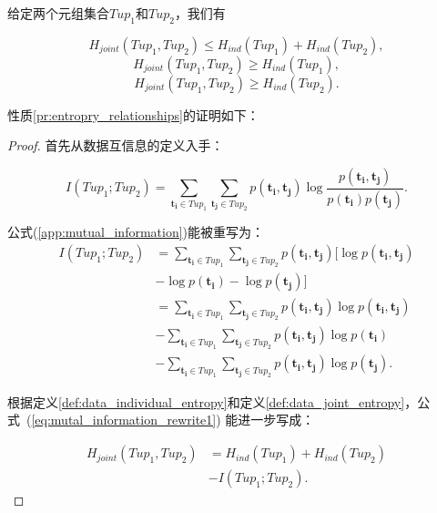 \begin{propt}[不同数据信息熵之间的关系]
给定两个元组集合$Tup_1$和$Tup_2$，我们有

\begin{equation}
\label{pr:entropry_relationships}
  H_{joint}(Tup_1,Tup_2)\le H_{ind}(Tup_1)+H_{ind}(Tup_2),
\end{equation}
\begin{equation}
  H_{joint}(Tup_1,Tup_2)\ge H_{ind}(Tup_1),
\end{equation}
\begin{equation}
  H_{joint}(Tup_1,Tup_2)\ge H_{ind}(Tup_2).
\end{equation}

性质\ref{pr:entropry_relationships}的证明如下：
\begin{proof}


首先从数据互信息的定义入手：

\begin{equation}
    I(Tup_1;Tup_2)=\sum_{\bm{t_i} \in Tup_1} \sum_{\bm{t_j} \in Tup_2} p(\bm{t_i},\bm{t_j}) \log\frac{p(\bm{t_i},\bm{t_j})}{p(\bm{t_i})p(\bm{t_j})}.
    \label{app:mutual_information}
\end{equation}


公式(\ref{app:mutual_information})能被重写为：
\begin{equation}
    \begin{aligned}
    I(Tup_1;Tup_2)&=\sum_{\bm{t_i} \in Tup_1} \sum_{\bm{t_j} \in Tup_2} p(\bm{t_i},\bm{t_j}) [\log p(\bm{t_i},\bm{t_j})\\
    &- \log p(\bm{t_i}) - \log p(\bm{t_j})]\\
    &=\sum_{\bm{t_i} \in Tup_1} \sum_{\bm{t_j} \in Tup_2} p(\bm{t_i},\bm{t_j})\log p(\bm{t_i},\bm{t_j})\\
    &-\sum_{\bm{t_i} \in Tup_1} \sum_{\bm{t_j} \in Tup_2} p(\bm{t_i},\bm{t_j})\log p(\bm{t_i})\\
    &-\sum_{\bm{t_i} \in Tup_1} \sum_{\bm{t_j} \in Tup_2} p(\bm{t_i},\bm{t_j})\log p(\bm{t_j}).
    \end{aligned}
    \label{eq:mutal_information_rewrite1}
\end{equation}

根据定义\ref{def:data_individual_entropy}和定义\ref{def:data_joint_entropy}，公式~(\ref{eq:mutal_information_rewrite1}) 能进一步写成：

\begin{equation}
\begin{aligned}
    H_{joint}(Tup_1,Tup_2)&=H_{ind}(Tup_1)+H_{ind}(Tup_2)\\
    &-I(Tup_1;Tup_2).
\label{eq:mutal_information_rewrite2}
\end{aligned}
\end{equation}


\end{proof}
\end{propt}

